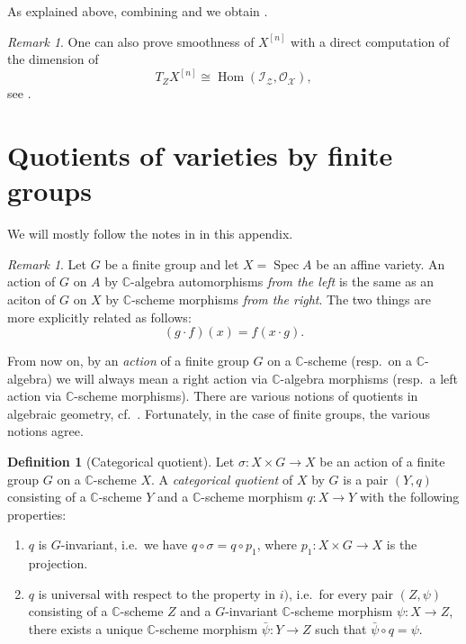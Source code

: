 \documentclass[12pt,a4paper]{amsart}
\theoremstyle{plain}
\theoremstyle{definition}
\newtheorem{defn}[thm]{Definition}
\theoremstyle{remark}
\newtheorem{rem}[thm]{Remark}
\begin{document}
As explained above, combining  and  we obtain .

\begin{rem}
  One can also prove smoothness of $X^{[n]}$ with a direct computation of the dimension of
  \[ T_{Z}X^{[n]} \cong \operatorname{Hom}(\mathscr{{I}_{Z}, \mathscr{O}_{X}}), \]
  see \cite[Example 4.5.10]{hl97}.
\end{rem}

\appendix

\section{Quotients of varieties by finite groups}\label{sec:quotient}

We will mostly follow the notes in \cite[Appendix A]{mus11} in this appendix.

\begin{rem}
  Let $G$ be a finite group and let $X = \operatorname{Spec}{A}$ be an affine variety.
  An action of $G$ on $A$ by $\mathbb{C}$-algebra automorphisms \textit{from the left} is the same as an aciton of $G$ on $X$ by $\mathbb{C}$-scheme morphisms \textit{from the right}.
  The two things are more explicitly related as follows:
  \[ (g \cdot f)(x) = f(x \cdot g). \]
\end{rem}

From now on, by an \textit{action} of a finite group $G$ on a $\mathbb{C}$-scheme (resp.~on a $\mathbb{C}$-algebra) we will always mean a right action via $\mathbb{C}$-algebra morphisms (resp.~a left action via $\mathbb{C}$-scheme morphisms).
There are various notions of quotients in algebraic geometry, cf.~\cite[\S 0.1]{mfk94}.
Fortunately, in the case of finite groups, the various notions agree.

\begin{defn}[Categorical quotient]
  Let $\sigma \colon X \times G \to X$ be an action of a finite group $G$ on a $\mathbb{C}$-scheme $X$.
  A \textit{categorical quotient} of $X$ by $G$ is a pair $(Y,q)$ consisting of a $\mathbb{C}$-scheme $Y$ and a $\mathbb{C}$-scheme morphism $q \colon X \to Y$ with the following properties:
  \begin{enumerate}[label=\roman*)]
    \item $q$ is $G$-invariant, i.e.~we have $q \circ \sigma = q \circ p_{1}$, where $p_{1} \colon X \times G \to X$ is the projection.
    \item $q$ is universal with respect to the property in $i)$, i.e.~for every pair $(Z,\psi)$ consisting of a $\mathbb{C}$-scheme $Z$ and a $G$-invariant $\mathbb{C}$-scheme morphism $\psi \colon X \to Z$, there exists a unique $\mathbb{C}$-scheme morphism $\bar{\psi} \colon Y \to Z$ such that $\bar{\psi} \circ q = \psi$.
  \end{enumerate}
\end{defn}
\end{document}
